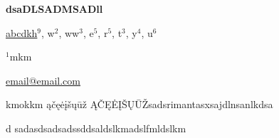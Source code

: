 \documentclass[12pt, twoside, a4paper, hidelinks]{article}
\begin{document}
        \begin{center}  \fontsize{14}{15}\selectfont \textbf{dsaDLSADMSADll} \end{center}
        \vspace{-0.8cm}\begin{center} \fontsize{12}{13}\selectfont \underline{abcdkh}$^{9}$, w$^{2}$, ww$^{3}$, e$^{5}$, r$^{5}$, t$^{3}$, y$^{4}$, u$^{6}$ \end{center}
        \vspace{-.5cm}

        \begin{center} \fontsize{10}{11}\selectfont $^{1}$mkm
            
            \underline{email@email.com}
         \end{center}

        \fontsize{10}{11}\selectfont kmokkm ąčęėįšųūž ĄČĘĖĮŠŲŪŽsadsrimantasxsajdlnsanlkdsa

d
sadasdsadsadssddsaldslkmadslfmldslkm
        
\end{document}
